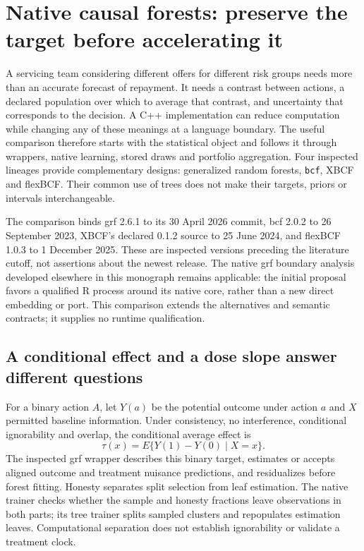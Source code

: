 \section{Native causal forests: preserve the target before accelerating it}
\label{exec21:cxx-scope}
A servicing team considering different offers for different risk groups needs more than an accurate forecast of repayment. It needs a contrast between actions, a declared population over which to average that contrast, and uncertainty that corresponds to the decision. A C++ implementation can reduce computation while changing any of these meanings at a language boundary. The useful comparison therefore starts with the statistical object and follows it through wrappers, native learning, stored draws and portfolio aggregation. Four inspected lineages provide complementary designs: generalized random forests, \texttt{bcf}, XBCF and flexBCF. Their common use of trees does not make their targets, priors or intervals interchangeable.\citep{exec21_cxx_grf,exec21_cxx_bcf,exec21_cxx_xbcf,exec21_cxx_flexbcf}

The comparison binds grf 2.6.1 to its 30 April 2026 commit, bcf 2.0.2 to 26 September 2023, XBCF's declared 0.1.2 source to 25 June 2024, and flexBCF 1.0.3 to 1 December 2025. These are inspected versions preceding the literature cutoff, not assertions about the newest release. The native grf boundary analysis developed elsewhere in this monograph remains applicable: the initial proposal favors a qualified R process around its native core, rather than a new direct embedding or port. This comparison extends the alternatives and semantic contracts; it supplies no runtime qualification.\citep{exec21_cxx_grf,exec21_cxx_bcf,exec21_cxx_xbcf,exec21_cxx_flexbcf}

\subsection{A conditional effect and a dose slope answer different questions}
\label{exec21:cxx-target}
For a binary action $A$, let $Y(a)$ be the potential outcome under action $a$ and $X$ permitted baseline information. Under consistency, no interference, conditional ignorability and overlap, the conditional average effect is
\begin{equation}
 \tau(x)=E\{Y(1)-Y(0)\mid X=x\}.
 \label{exec21:cxx-cate}
\end{equation}
The inspected grf wrapper describes this binary target, estimates or accepts aligned outcome and treatment nuisance predictions, and residualizes before forest fitting. Honesty separates split selection from leaf estimation. The native trainer checks whether the sample and honesty fractions leave observations in both parts; its tree trainer splits sampled clusters and repopulates estimation leaves. Computational separation does not establish ignorability or validate a treatment clock.\citep{exec21_cxx_grf}


